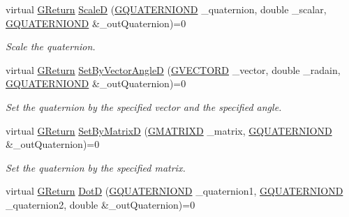 \begin{DoxyCompactItemize}
virtual \mbox{\hyperlink{namespace_g_w_a67a839e3df7ea8a5c5686613a7a3de21}{G\+Return}} \mbox{\hyperlink{class_g_w_1_1_m_a_t_h_1_1_g_quaternion_ad65dc6353347a103c79a1e4f4a3b8534}{ScaleD}} (\mbox{\hyperlink{struct_g_w_1_1_m_a_t_h_1_1_g_q_u_a_t_e_r_n_i_o_n_d}{G\+Q\+U\+A\+T\+E\+R\+N\+I\+O\+ND}} \+\_\+quaternion, double \+\_\+scalar, \mbox{\hyperlink{struct_g_w_1_1_m_a_t_h_1_1_g_q_u_a_t_e_r_n_i_o_n_d}{G\+Q\+U\+A\+T\+E\+R\+N\+I\+O\+ND}} \&\+\_\+out\+Quaternion)=0
\begin{DoxyCompactList}\small\item\em Scale the quaternion. \end{DoxyCompactList}\item 
virtual \mbox{\hyperlink{namespace_g_w_a67a839e3df7ea8a5c5686613a7a3de21}{G\+Return}} \mbox{\hyperlink{class_g_w_1_1_m_a_t_h_1_1_g_quaternion_a6d27eb89fc133c7746e2373cc2e0a3c4}{Set\+By\+Vector\+AngleD}} (\mbox{\hyperlink{struct_g_w_1_1_m_a_t_h_1_1_g_v_e_c_t_o_r_d}{G\+V\+E\+C\+T\+O\+RD}} \+\_\+vector, double \+\_\+radain, \mbox{\hyperlink{struct_g_w_1_1_m_a_t_h_1_1_g_q_u_a_t_e_r_n_i_o_n_d}{G\+Q\+U\+A\+T\+E\+R\+N\+I\+O\+ND}} \&\+\_\+out\+Quaternion)=0
\begin{DoxyCompactList}\small\item\em Set the quaternion by the specified vector and the specified angle. \end{DoxyCompactList}\item 
virtual \mbox{\hyperlink{namespace_g_w_a67a839e3df7ea8a5c5686613a7a3de21}{G\+Return}} \mbox{\hyperlink{class_g_w_1_1_m_a_t_h_1_1_g_quaternion_a22539c93e600bce0d09081eeec368c9c}{Set\+By\+MatrixD}} (\mbox{\hyperlink{struct_g_w_1_1_m_a_t_h_1_1_g_m_a_t_r_i_x_d}{G\+M\+A\+T\+R\+I\+XD}} \+\_\+matrix, \mbox{\hyperlink{struct_g_w_1_1_m_a_t_h_1_1_g_q_u_a_t_e_r_n_i_o_n_d}{G\+Q\+U\+A\+T\+E\+R\+N\+I\+O\+ND}} \&\+\_\+out\+Quaternion)=0
\begin{DoxyCompactList}\small\item\em Set the quaternion by the specified matrix. \end{DoxyCompactList}\item 
virtual \mbox{\hyperlink{namespace_g_w_a67a839e3df7ea8a5c5686613a7a3de21}{G\+Return}} \mbox{\hyperlink{class_g_w_1_1_m_a_t_h_1_1_g_quaternion_acffef6fd3e2d5f726428f2c09a4c6a72}{DotD}} (\mbox{\hyperlink{struct_g_w_1_1_m_a_t_h_1_1_g_q_u_a_t_e_r_n_i_o_n_d}{G\+Q\+U\+A\+T\+E\+R\+N\+I\+O\+ND}} \+\_\+quaternion1, \mbox{\hyperlink{struct_g_w_1_1_m_a_t_h_1_1_g_q_u_a_t_e_r_n_i_o_n_d}{G\+Q\+U\+A\+T\+E\+R\+N\+I\+O\+ND}} \+\_\+quaternion2, double \&\+\_\+out\+Quaternion)=0

\end{DoxyCompactItemize}
